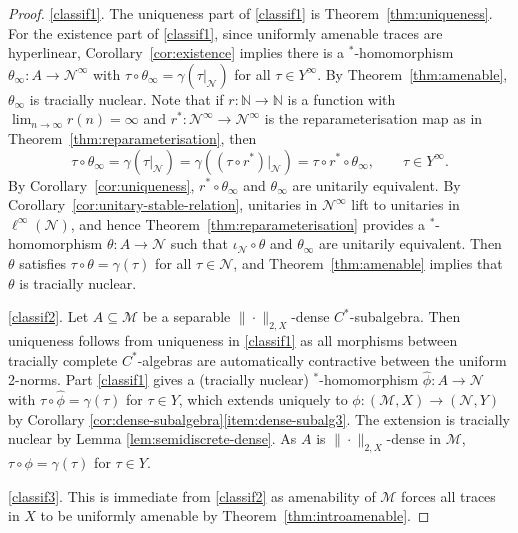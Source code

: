 \documentclass[a4paper,11pt]{amsart}
\theoremstyle{definition}
\numberwithin{equation}{section}
\numberwithin{theorem}{section}
\newcommand{\M}{\mathcal{M}}
\begin{document}
\begin{proof}
\ref{classif1}. The uniqueness part of \ref{classif1} is Theorem~\ref{thm:uniqueness}. For the existence part of \ref{classif1}, since uniformly amenable traces are hyperlinear, Corollary~\ref{cor:existence} implies there is a $^*$-homomorphism $\theta_\infty \colon A \rightarrow \mathcal N^\infty$ with \mbox{$\tau \circ \theta_\infty = \gamma(\tau|_\mathcal N)$} for all $\tau \in Y^\infty$.  By Theorem~\ref{thm:amenable}, $\theta_\infty$ is tracially nuclear.  Note that if $r \colon \mathbb N \rightarrow \mathbb N$ is a function with $\lim_{n \rightarrow \infty} r(n) = \infty$ and $r^* \colon \mathcal N^\infty \rightarrow \mathcal N^\infty$ is the reparameterisation map as in Theorem~\ref{thm:reparameterisation}, then  
 \begin{equation}
    \tau \circ \theta_\infty=\gamma(\tau|_{\mathcal N})=\gamma((\tau\circ r^*)|_{\mathcal N})=\tau \circ r^* \circ \theta_\infty,\qquad\tau \in Y^\infty.   
 \end{equation}
By Corollary~\ref{cor:uniqueness}, $r^* \circ \theta_\infty$ and $\theta_\infty$ are unitarily equivalent.  By Corollary~\ref{cor:unitary-stable-relation}, unitaries in $\mathcal N^\infty$ lift to unitaries in $\ell^\infty(\mathcal N)$, and hence Theorem~\ref{thm:reparameterisation} provides a $^*$-homomorphism $\theta \colon A \rightarrow \mathcal N$ such that $\iota_\mathcal N \circ \theta$ and $\theta_\infty$ are unitarily equivalent.  Then $\theta$ satisfies $\tau \circ \theta = \gamma(\tau)$ for all $\tau \in \mathcal N$, and Theorem~\ref{thm:amenable} implies that $\theta$ is tracially nuclear.

\ref{classif2}.  Let $A \subseteq \M$ be a separable $\|\cdot\|_{2, X}$-dense $C^*$-subalgebra. Then uniqueness follows from uniqueness in \ref{classif1} as all morphisms between tracially complete $C^*$-algebras are automatically contractive between the uniform 2-norms.  Part \ref{classif1} gives a (tracially nuclear) $^*$-homomorphism $\hat{\phi}\colon A\to\mathcal N$ with $\tau\circ\hat{\phi}=\gamma(\tau)$ for $\tau\in Y$, which extends uniquely to $\phi\colon (\M,X)\to(\mathcal N,Y)$ by Corollary \ref{cor:dense-subalgebra}\ref{item:dense-subalg3}. The extension is tracially nuclear by Lemma \ref{lem:semidiscrete-dense}. As $A$ is $\|\cdot\|_{2,X}$-dense in $\M$, $\tau\circ\phi=\gamma(\tau)$ for $\tau\in Y$. 

\ref{classif3}. This is immediate from \ref{classif2} as {}amenability of $\M$ forces all traces in $X$ to be uniformly amenable by Theorem~\ref{thm:introamenable}.
\end{proof}
		
\end{document}
